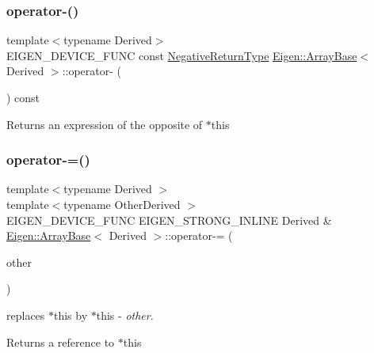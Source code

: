 \subsubsection{\texorpdfstring{operator-\/()}{operator-()}}
{\footnotesize\ttfamily template$<$typename Derived$>$ \\
E\+I\+G\+E\+N\+\_\+\+D\+E\+V\+I\+C\+E\+\_\+\+F\+U\+NC const \mbox{\hyperlink{class_eigen_1_1_cwise_unary_op}{Negative\+Return\+Type}} \mbox{\hyperlink{class_eigen_1_1_array_base}{Eigen\+::\+Array\+Base}}$<$ Derived $>$\+::operator-\/ (\begin{DoxyParamCaption}{ }\end{DoxyParamCaption}) const\hspace{0.3cm}{\ttfamily [inline]}}

\begin{DoxyReturn}{Returns}
an expression of the opposite of {\ttfamily $\ast$this} 
\end{DoxyReturn}
\mbox{\label{class_eigen_1_1_array_base_a6648eeebc4a9d407605410a7149f1a93}} 
\subsubsection{\texorpdfstring{operator-\/=()}{operator-=()}}
{\footnotesize\ttfamily template$<$typename Derived $>$ \\
template$<$typename Other\+Derived $>$ \\
E\+I\+G\+E\+N\+\_\+\+D\+E\+V\+I\+C\+E\+\_\+\+F\+U\+NC E\+I\+G\+E\+N\+\_\+\+S\+T\+R\+O\+N\+G\+\_\+\+I\+N\+L\+I\+NE Derived \& \mbox{\hyperlink{class_eigen_1_1_array_base}{Eigen\+::\+Array\+Base}}$<$ Derived $>$\+::operator-\/= (\begin{DoxyParamCaption}\item[{const \mbox{\hyperlink{class_eigen_1_1_array_base}{Array\+Base}}$<$ Other\+Derived $>$ \&}]{other }\end{DoxyParamCaption})}

replaces {\ttfamily $\ast$this} by {\ttfamily $\ast$this} -\/ {\itshape other}.

\begin{DoxyReturn}{Returns}
a reference to {\ttfamily $\ast$this} 
\end{DoxyReturn}
\mbox{\label{class_eigen_1_1_array_base_a65770de30d83fefe046011c1d2258391}} 
